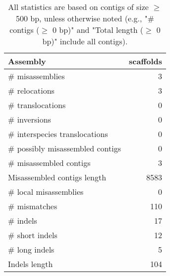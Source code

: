 \documentclass[12pt,a4paper]{article}
\begin{document}
\begin{table}[ht]
\begin{center}
\caption{All statistics are based on contigs of size $\geq$ 500 bp, unless otherwise noted (e.g., "\# contigs ($\geq$ 0 bp)" and "Total length ($\geq$ 0 bp)" include all contigs).}
\begin{tabular}{|l*{1}{|r}|}
\hline
Assembly & scaffolds \\ \hline
\# misassemblies & 3 \\ \hline
\hspace{5mm}\# relocations & 3 \\ \hline
\hspace{5mm}\# translocations & 0 \\ \hline
\hspace{5mm}\# inversions & 0 \\ \hline
\hspace{5mm}\# interspecies translocations & 0 \\ \hline
\# possibly misassembled contigs & 0 \\ \hline
\# misassembled contigs & 3 \\ \hline
Misassembled contigs length & 8583 \\ \hline
\# local misassemblies & 0 \\ \hline
\# mismatches & 110 \\ \hline
\# indels & 17 \\ \hline
\hspace{5mm}\# short indels & 12 \\ \hline
\hspace{5mm}\# long indels & 5 \\ \hline
Indels length & 104 \\ \hline
\end{tabular}
\end{center}
\end{table}
\end{document}
